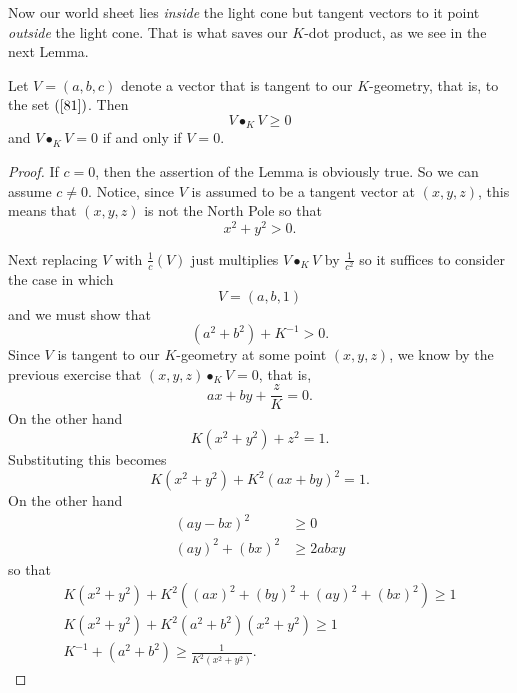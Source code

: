\documentclass{ximera}
\begin{document}
Now our world sheet lies \textit{inside} the light cone but tangent vectors to
it point \textit{outside} the light cone. That is what saves our $K$-dot
product, as we see in the next Lemma.

\begin{lemma}
Let $V=\left(  a,b,c\right)  $ denote a vector that is tangent
to our $K$-geometry, that is, to the set $\left(  \ref{81}\right)  $. Then%
\[
V\bullet_{K}V\geq0
\]
and $V\bullet_{K}V=0$ if and only if $V=0$.
\end{lemma}

\begin{proof}
If $c=0$, then the assertion of the Lemma is obviously true. So we can assume
$c\neq0$. Notice, since $V$ is assumed to be a tangent vector at $\left(
x,y,z\right)  $, this means that $\left(  x,y,z\right)  $ is not the North
Pole so that
\[
x^{2}+y^{2}>0.
\]


Next replacing $V$ with $\frac{1}{c}\left(  V\right)  $ just multiplies
$V\bullet_{K}V$ by $\frac{1}{c^{2}}$ so it suffices to consider the case in
which%
\[
V=\left(  a,b,1\right)
\]
and we must show that%
\[
\left(  a^{2}+b^{2}\right)  +K^{-1}>0.
\]
Since $V$ is tangent to our $K$-geometry at some point $\left(  x,y,z\right)
$, we know by the previous exercise %
that $\left(  x,y,z\right)  \bullet_{K}V=0$,
that is,%
\[
ax+by+\frac{z}{K}=0.
\]
On the other hand%
\[
K\left(  x^{2}+y^{2}\right)  +z^{2}=1.
\]
Substituting this becomes%
\[
K\left(  x^{2}+y^{2}\right)  +K^{2}\left(  ax+by\right)  ^{2}=1.
\]
On the other hand%
\begin{align*}
\left(  ay-bx\right)  ^{2}  &  \geq0\\
\left(  ay\right)  ^{2}+\left(  bx\right)  ^{2}  &  \geq2abxy
\end{align*}
so that%
\begin{gather*}
K\left(  x^{2}+y^{2}\right)  +K^{2}\left(  \left(  ax\right)  ^{2}+\left(
by\right)  ^{2}+\left(  ay\right)  ^{2}+\left(  bx\right)  ^{2}\right)
\geq1\\
K\left(  x^{2}+y^{2}\right)  +K^{2}\left(  a^{2}+b^{2}\right)  \left(
x^{2}+y^{2}\right)  \geq1\\
K^{-1}+\left(  a^{2}+b^{2}\right)  \geq\frac{1}{K^{2}\left(  x^{2}%
+y^{2}\right)  }.
\end{gather*}

\end{proof}
\end{document}
